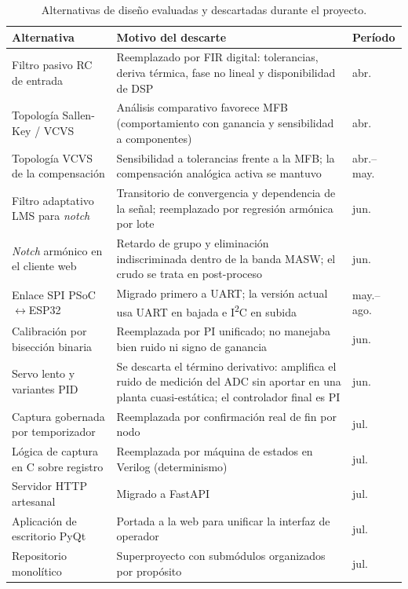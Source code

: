 \begin{table}[h]
\centering\footnotesize
\caption{Alternativas de dise\~no evaluadas y descartadas durante el proyecto.}
\label{tab:descartes}
\begin{tabularx}{\textwidth}{@{}l X l@{}}
\toprule
\textbf{Alternativa} & \textbf{Motivo del descarte} & \textbf{Per\'iodo} \\
\midrule
Filtro pasivo RC de entrada & Reemplazado por FIR digital: tolerancias, deriva t\'ermica, fase no lineal y disponibilidad de DSP & abr. \\
Topolog\'ia Sallen-Key / VCVS & An\'alisis comparativo favorece MFB (comportamiento con ganancia y sensibilidad a componentes) & abr. \\
Topolog\'ia VCVS de la compensaci\'on & Sensibilidad a tolerancias frente a la MFB; la compensaci\'on anal\'ogica activa se mantuvo & abr.--may. \\
Filtro adaptativo LMS para \emph{notch} & Transitorio de convergencia y dependencia de la se\~nal; reemplazado por regresi\'on arm\'onica por lote & jun. \\
\emph{Notch} arm\'onico en el cliente web & Retardo de grupo y eliminaci\'on indiscriminada dentro de la banda MASW; el crudo se trata en post-proceso & jun. \\
Enlace SPI PSoC$\leftrightarrow$ESP32 & Migrado primero a UART; la versi\'on actual usa UART en bajada e I\textsuperscript{2}C en subida & may.--ago. \\
Calibraci\'on por bisecci\'on binaria & Reemplazada por PI unificado; no manejaba bien ruido ni signo de ganancia & jun. \\
Servo lento y variantes PID & Se descarta el t\'ermino derivativo: amplifica el ruido de medici\'on del ADC sin aportar en una planta cuasi-est\'atica; el controlador final es PI & jun. \\
Captura gobernada por temporizador & Reemplazada por confirmaci\'on real de fin por nodo & jul. \\
L\'ogica de captura en C sobre registro & Reemplazada por m\'aquina de estados en Verilog (determinismo) & jul. \\
Servidor HTTP artesanal & Migrado a FastAPI & jul. \\
Aplicaci\'on de escritorio PyQt & Portada a la web para unificar la interfaz de operador & jul. \\
Repositorio monol\'itico & Superproyecto con subm\'odulos organizados por prop\'osito & jul. \\
\bottomrule
\end{tabularx}
\end{table}

